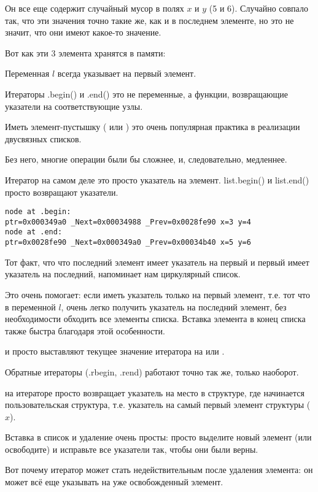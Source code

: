 Он все еще содержит случайный мусор в полях $x$ и $y$ (5 и 6). 
Случайно совпало так, что эти значения точно такие же, как и в последнем элементе, но это не значит,
что они имеют какое-то значение.

Вот как эти 3 элемента хранятся в памяти:



Переменная $l$ всегда указывает на первый элемент.

Итераторы .begin() и .end() это не переменные, а функции,
возвращающие указатели на соответствующие узлы.

Иметь элемент-пустышку ( или ) это очень популярная практика в реализации двусвязных списков.%

Без него, многие операции были бы сложнее, и, следовательно, медленнее.

Итератор на самом деле это просто указатель на элемент.
list.begin() и list.end() просто возвращают указатели.

\begin{lstlisting}
node at .begin:
ptr=0x000349a0 _Next=0x00034988 _Prev=0x0028fe90 x=3 y=4
node at .end:
ptr=0x0028fe90 _Next=0x000349a0 _Prev=0x00034b40 x=5 y=6
\end{lstlisting}

Тот факт, что что последний элемент имеет указатель на первый 
и первый имеет указатель на последний, напоминает нам циркулярный список.

Это очень помогает: если иметь указатель только на первый элемент, т.е.
тот что в переменной $l$, очень легко получить указатель на последний элемент, без необходимости
обходить все элементы списка.
Вставка элемента в конец списка также быстра благодаря этой особенности.

 и  просто выставляют текущее значение итератора на  или .

Обратные итераторы (.rbegin, .rend) работают точно так же, только наоборот.

 на итераторе просто возвращает указатель на место в структуре, где начинается пользовательская
структура, т.е. указатель на самый первый элемент структуры ($x$).

Вставка в список и удаление очень просты: просто выделите новый элемент (или освободите) и исправьте
все указатели так, чтобы они были верны.

Вот почему итератор может стать недействительным после удаления элемента:
он может всё еще указывать на уже освобожденный элемент.

